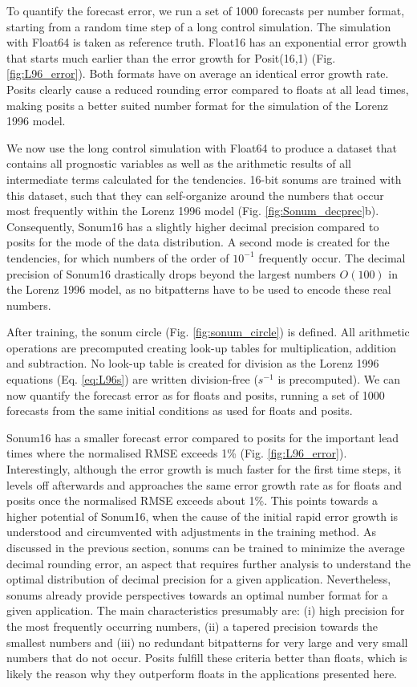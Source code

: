 To quantify the forecast error, we run a set of 1000 forecasts per number format, starting from a random time step of a long control simulation. The simulation with Float64 is taken as reference truth. Float16 has an exponential error growth that starts much earlier than the error growth for Posit(16,1) (Fig. \ref{fig:L96_error}). Both formats have on average an identical error growth rate. Posits clearly cause a reduced rounding error compared to floats at all lead times, making posits a better suited number format for the simulation of the Lorenz 1996 model.

We now use the long control simulation with Float64 to produce a dataset that contains all prognostic variables as well as the arithmetic results of all intermediate terms calculated for the tendencies. 16-bit sonums are trained with this dataset, such that they can self-organize around the numbers that occur most frequently within the Lorenz 1996 model (Fig. \ref{fig:Sonum_decprec}b). Consequently, Sonum16 has a slightly higher decimal precision compared to posits for the mode of the data distribution. A second mode is created for the tendencies, for which numbers of the order of $10^{-1}$ frequently occur. The decimal precision of Sonum16 drastically drops beyond the largest numbers $O(100)$ in the Lorenz 1996 model, as no bitpatterns have to be used to encode these real numbers.

After training, the sonum circle (Fig. \ref{fig:sonum_circle}) is defined. All arithmetic operations are precomputed creating look-up tables for multiplication, addition and subtraction. No look-up table is created for division as the Lorenz 1996 equations (Eq. \ref{eq:L96s}) are written division-free ($s^{-1}$ is precomputed). We can now quantify the forecast error as for floats and posits, running a set of 1000 forecasts from the same initial conditions as used for floats and posits.

Sonum16 has a smaller forecast error compared to posits for the important lead times where the normalised RMSE exceeds 1\% (Fig. \ref{fig:L96_error}). Interestingly, although the error growth is much faster for the first time steps, it levels off afterwards and approaches the same error growth rate as for floats and posits once the normalised RMSE exceeds about 1\%. This points towards a higher potential of Sonum16, when the cause of the initial rapid error growth is understood and circumvented with adjustments in the training method. As discussed in the previous section, sonums can be trained to minimize the average decimal rounding error, an aspect that requires further analysis to understand the optimal distribution of decimal precision for a given application. Nevertheless, sonums already provide perspectives towards an optimal number format for a given application. The main characteristics presumably are: (i) high precision for the most frequently occurring numbers, (ii) a tapered precision towards the smallest numbers and (iii) no redundant bitpatterns for very large and very small numbers that do not occur. Posits fulfill these criteria better than floats, which is likely the reason why they outperform floats in the applications presented here.

